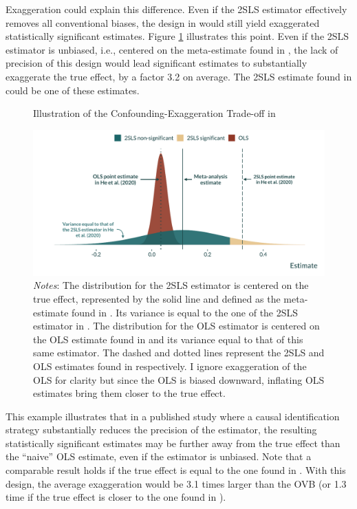 \documentclass[usletter, 12pt]{article}
\begin{document}
		Exaggeration could explain this difference. Even if the 2SLS estimator effectively removes all conventional biases, the design in \cite{he_straw_2020} would still yield exaggerated statistically significant estimates. Figure \ref{graph_he} illustrates this point. Even if the 2SLS estimator is unbiased, i.e., centered on the meta-estimate found in \cite{shah_short_2015}, the lack of precision of this design would lead significant estimates to substantially exaggerate the true effect, by a factor 3.2 on average.  The 2SLS estimate found in \cite{he_straw_2020} could be one of these estimates.
				
		\begin{figure}[!h]
                   	\caption{Illustration of the Confounding-Exaggeration Trade-off in \cite{he_straw_2020}}
                        \label{graph_he}
                    	\centering
                    	\includegraphics[width=0.85\linewidth]{images/graph_he_th_annotated.pdf}
                   	 \caption*{\footnotesize \textnormal{\textit{Notes}:  %
	 The distribution for the 2SLS estimator is centered on the true effect, represented by the solid line and defined as the meta-estimate found in \cite{shah_short_2015}. Its variance is equal to the one of the 2SLS estimator in \cite{he_straw_2020}. The distribution for the OLS estimator is centered on the OLS estimate found in \cite{he_straw_2020} and its variance equal to that of this same estimator. The dashed and dotted lines represent the 2SLS and OLS estimates found in \cite{he_straw_2020} respectively. I ignore exaggeration of the OLS for clarity but since the OLS is biased downward, inflating OLS estimates bring them closer to the true effect. }}
                \end{figure}
						
		This example illustrates that in a published study where a causal identification strategy substantially reduces the precision of the estimator, the resulting statistically significant estimates may be further away from the true effect than the ``naive'' OLS estimate, even if the estimator is unbiased. Note that a comparable result holds if the true effect is equal to the one found in \cite{deryugina_mortality_2019}. With this design, the average exaggeration would be 3.1 times larger than the OVB (or 1.3 time if the true effect is closer to the one found in \cite{deryugina_mortality_2019}).
\end{document}
